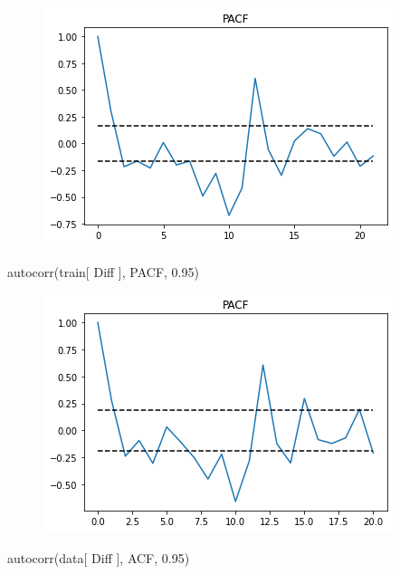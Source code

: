 \documentclass[
  letterpaper,
  DIV=11,
  numbers=noendperiod]{scrartcl}
\newenvironment{Shaded}{\begin{snugshade}}{\end{snugshade}}
\newcommand{\FloatTok}[1]{\textcolor[rgb]{0.68,0.00,0.00}{#1}}
\newcommand{\NormalTok}[1]{\textcolor[rgb]{0.00,0.23,0.31}{#1}}
\newcommand{\StringTok}[1]{\textcolor[rgb]{0.13,0.47,0.30}{#1}}
\begin{document}
\begin{figure}[H]

{\centering \includegraphics{main_files/figure-pdf/cell-16-output-1.png}

}

\end{figure}

\begin{Shaded}
\begin{Highlighting}[]
\NormalTok{autocorr(train[ }\StringTok{\textquotesingle{}Diff\textquotesingle{}}\NormalTok{ ], }\StringTok{\textquotesingle{}PACF\textquotesingle{}}\NormalTok{, }\FloatTok{0.95}\NormalTok{)}
\end{Highlighting}
\end{Shaded}

\begin{figure}[H]

{\centering \includegraphics{main_files/figure-pdf/cell-17-output-1.png}

}

\end{figure}

\begin{Shaded}
\begin{Highlighting}[]
\NormalTok{autocorr(data[ }\StringTok{\textquotesingle{}Diff\textquotesingle{}}\NormalTok{ ], }\StringTok{\textquotesingle{}ACF\textquotesingle{}}\NormalTok{, }\FloatTok{0.95}\NormalTok{)}
\end{Highlighting}
\end{Shaded}
\end{document}
